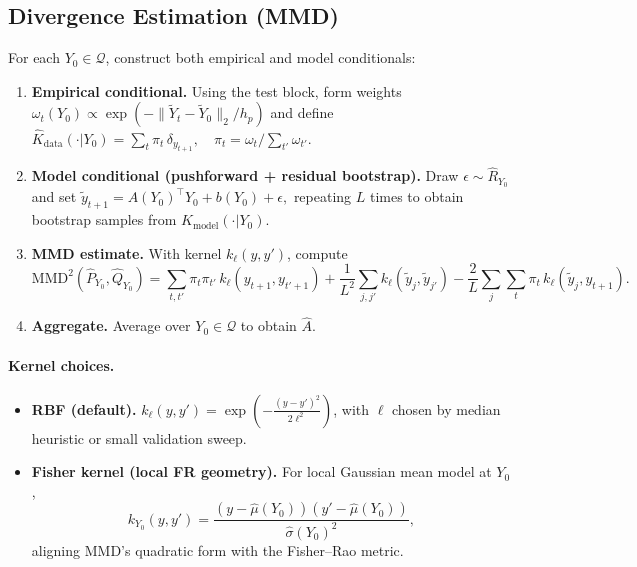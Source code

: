 \documentclass[11pt]{article}
\newcommand{\1}{\mathbf{1}}
\begin{document}
\subsection{Divergence Estimation (MMD)}
For each $Y_0 \in \mathcal Q$, construct both empirical and model conditionals:

\begin{enumerate}
    \item \textbf{Empirical conditional.} Using the test block, form weights 
    \( \omega_t(Y_0) \propto \exp(-\|\widetilde Y_t-\widetilde Y_0\|_2/h_p) \)
    and define
    \(
      \widehat K_{\mathrm{data}}(\cdot|Y_0) = \sum_t \pi_t \,\delta_{y_{t+1}},\quad
      \pi_t = \omega_t / \sum_{t'} \omega_{t'}.
    \)

    \item \textbf{Model conditional (pushforward + residual bootstrap).} Draw $\epsilon \sim \widehat R_{Y_0}$ and set
    \(
      \tilde y_{t+1} = A(Y_0)^\top Y_0 + b(Y_0) + \epsilon,
    \)
    repeating $L$ times to obtain bootstrap samples from $\widehat K_{\mathrm{model}}(\cdot|Y_0)$.

    \item \textbf{MMD estimate.} With kernel $k_\ell(y,y')$, compute
    \[
    \mathrm{MMD}^2(\widehat P_{Y_0},\widehat Q_{Y_0})
    = \sum_{t,t'}\pi_t\pi_{t'}\,k_\ell(y_{t+1},y_{t'+1})
    + \frac{1}{L^2}\sum_{j,j'} k_\ell(\tilde y_j,\tilde y_{j'})
    - \frac{2}{L}\sum_{j}\sum_t \pi_t\,k_\ell(\tilde y_j,y_{t+1}).
    \]
    \item \textbf{Aggregate.} Average over $Y_0\in\mathcal Q$ to obtain $\widehat A$.
\end{enumerate}

\paragraph{Kernel choices.}
\begin{itemize}
  \item \textbf{RBF (default).} $k_\ell(y,y')=\exp(-\tfrac{(y-y')^2}{2\ell^2})$, with $\ell$ chosen by median heuristic or small validation sweep.
  \item \textbf{Fisher kernel (local FR geometry).} For local Gaussian mean model at $Y_0$,
  \[
    k_{Y_0}(y,y') = \frac{(y-\widehat\mu(Y_0))(y'-\widehat\mu(Y_0))}{\widehat\sigma(Y_0)^2},
  \]
  aligning MMD’s quadratic form with the Fisher–Rao metric.
\end{itemize}
\end{document}
